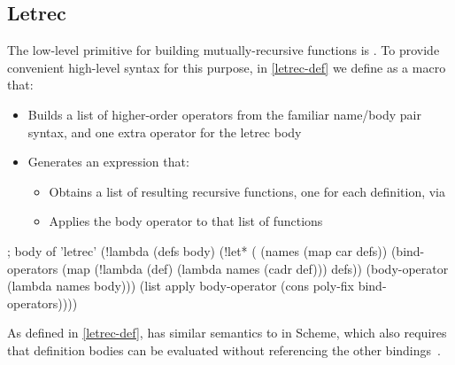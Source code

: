 \subsection{Letrec}
\label{letrec}
The low-level primitive for building mutually-recursive functions is
. To provide convenient high-level syntax for this purpose,
in \cref{letrec-def} we define  as a macro that:
\begin{itemize}
\item Builds a list of higher-order operators
from the familiar name/body pair syntax, and one extra
operator for the letrec body
\item Generates an expression that:
  \begin{itemize}
  \item Obtains a list of resulting recursive functions, one for each definition, via 
  \item Applies the body operator to that list of functions
  \end{itemize}
\end{itemize}

\begin{listingbox}\begin{ildcode}
; body of 'letrec'
(!lambda (defs body)
  (!let*
    ( (names (map car defs))
      (bind-operators
        (map
          (!lambda (def)
            (lambda names (cadr def)))
          defs))
      (body-operator
        (lambda names body)))
    (list
      apply
      body-operator
      (cons poly-fix bind-operators))))
\end{ildcode}\end{listingbox}
\label{letrec-def}
As defined in \cref{letrec-def},  has similar semantics
to  in Scheme, which also requires that definition bodies
can be evaluated without referencing the other bindings~\cite{r5rs}.
